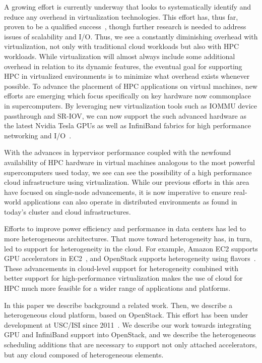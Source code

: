 A growing effort is currently underway that looks to systematically identify and
reduce any overhead in virtualization technologies. This effort has, thus far,
proven to be a qualified success~\cite{Younge2011cloud, Luszczek:2011:EHC}, though further research is needed to address
issues of scalability and I/O.  Thus, we see a constantly diminishing overhead
with virtualization, not only with traditional cloud workloads
\cite{huber2011evaluating} but also with HPC workloads.  While virtualization
will almost always include some additional overhead in relation to its dynamic
features, the eventual goal for supporting HPC in virtualized environments is to
minimize what overhead exists whenever possible.  To advance the placement of
HPC applications on virtual machines, new efforts are emerging which focus
specifically on key hardware now commonplace in supercomputers. By leveraging
new virtualization tools such as IOMMU device passthrough and SR-IOV, we can now
support the such advanced hardware as the latest Nvidia Tesla GPUs
\cite{Walters2014cloud}  as well as InfiniBand fabrics for high performance networking
and I/O~\cite{jose2013sr,Musleh2014cloud}.  

With the advances in hypervisor performance coupled with the newfound availability of HPC hardware in virtual machines analogous to the most powerful supercomputers used today, we see can see the possibility of a high performance cloud infrastructure using virtualization. While our previous efforts in this area have focused on single-node advancements, it is now imperative to ensure real-world applications can also operate in distributed environments as found in today's cluster and cloud infrastructures. 

Efforts to improve power efficiency and performance in data centers has led to more heterogeneous architectures. That move toward heterogeneity has, in turn, led to support for heterogeneity in the cloud. For example, Amazon EC2 supports GPU accelerators in EC2~\cite{www-amazon-gpu}, and OpenStack supports heterogeneity using flavors~\cite{www-openstack-flavors}. These advancements in cloud-level support for heterogeneity combined with better support for high-performance virtualization makes the use of cloud for HPC much more feasible for a wider range of applications and platforms.

In this paper we describe background a related work. Then, we describe a heterogeneous cloud platform, based on OpenStack. This
effort has been under development at USC/ISI since 2011~\cite{crago2011heterogeneous}.
We describe our work towards integrating GPU and InfiniBand support into
OpenStack, and we describe the heterogeneous scheduling additions that are
necessary to support not only attached accelerators, but any cloud composed of
heterogeneous elements.  

